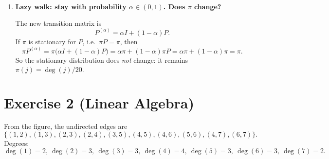 \documentclass[11pt]{article}
\begin{document}
\begin{enumerate}[label=(\alph*)]
If $i\sim j$ (there is an edge), then
\[
\pi(i)P_{ij}=\frac{\deg(i)}{20}\cdot \frac{1}{\deg(i)}=\frac{1}{20}
=\frac{\deg(j)}{20}\cdot \frac{1}{\deg(j)}=\pi(j)P_{ji}.
\]
Hence the chain is reversible.

\item \textbf{Lazy walk: stay with probability $\alpha\in(0,1)$. Does $\pi$ change?}

The new transition matrix is
\[
P^{(\alpha)}=\alpha I + (1-\alpha)P.
\]
If $\pi$ is stationary for $P$, i.e.\ $\pi P=\pi$, then
\[
\pi P^{(\alpha)}
=\pi\bigl(\alpha I + (1-\alpha)P\bigr)
=\alpha \pi + (1-\alpha)\pi P
=\alpha \pi + (1-\alpha)\pi
=\pi.
\]
So the stationary distribution does \emph{not} change: it remains $\pi(j)=\deg(j)/20$.
\end{enumerate}

\section*{Exercise 2 (Linear Algebra)}

From the figure, the undirected edges are
\[
\{(1,2),(1,3),(2,3),(2,4),(3,5),(4,5),(4,6),(5,6),(4,7),(6,7)\}.
\]
Degrees:
\[
\deg(1)=2,\ \deg(2)=3,\ \deg(3)=3,\ \deg(4)=4,\ \deg(5)=3,\ \deg(6)=3,\ \deg(7)=2.
\]
\end{document}

